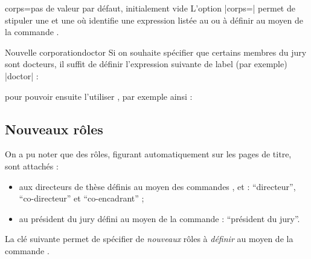\begin{docKey}{corps}{=}{pas de valeur par défaut, initialement
    vide}
  L'option |corps=| permet de stipuler une  et une  où  identifie une
  expression listée au  ou à définir au moyen de la
  commande .
\end{docKey}

\begin{dbexample}{Nouvelle corporation}{doctor}
  Si on souhaite spécifier que certains membres du jury sont docteurs, il
  suffit de définir  l'expression suivante de label (par
  exemple) |doctor| :
\begin{preamblecode}[title=Par exemple dans le \File{\configurationfile}]
\end{preamblecode}
  pour pouvoir ensuite l'utiliser , par
  exemple ainsi :
\begin{bodycode}
\end{bodycode}
\end{dbexample}

\subsection{Nouveaux rôles}\label{sec-nouveaux-roles}
%
%

On a pu noter  que des rôles, figurant automatiquement sur les
pages de titre, sont attachés :
\begin{itemize}
\item aux directeurs de thèse définis au moyen des commandes
  ,  et  :
  \enquote{directeur}, \enquote{co-directeur} et \enquote{co-encadrant} ;
\item au président du jury défini au moyen de la commande
   : \enquote{président du jury}.
\end{itemize}
La clé  suivante permet de spécifier de \emph{nouveaux} rôles
à \emph{définir} au moyen de la commande .

